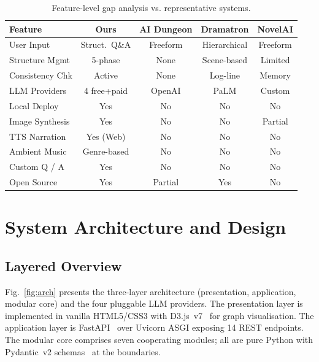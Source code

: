 \documentclass[conference,10pt,a4paper]{IEEEtran}
\begin{document}
\begin{table}[!t]
\caption{Feature-level gap analysis vs. representative systems.}
\label{tab:gap}
\centering
\renewcommand{\arraystretch}{1.15}
\begin{tabular}{@{}l|cccc@{}}
\toprule
\textbf{Feature} & \textbf{Ours} & \textbf{AI Dungeon} & \textbf{Dramatron} & \textbf{NovelAI} \\
\midrule
User Input         & Struct.\ Q\&A & Freeform   & Hierarchical & Freeform \\
Structure Mgmt     & 5-phase       & None       & Scene-based  & Limited \\
Consistency Chk    & Active        & None       & Log-line     & Memory \\
LLM Providers      & 4 free+paid   & OpenAI     & PaLM         & Custom \\
Local Deploy       & Yes           & No         & No           & No \\
Image Synthesis    & Yes           & No         & No           & Partial \\
TTS Narration      & Yes (Web)     & No         & No           & No \\
Ambient Music      & Genre-based   & No         & No           & No \\
Custom Q / A       & Yes           & No         & No           & No \\
Open Source        & Yes           & Partial    & Yes          & No \\
\bottomrule
\end{tabular}
\end{table}

\section{System Architecture and Design}\label{sec:arch}

\subsection{Layered Overview}
Fig.~\ref{fig:arch} presents the three-layer architecture
(presentation, application, modular core) and the four pluggable LLM
providers. The presentation layer is implemented in vanilla
HTML5/CSS3 with D3.js~v7~\cite{bostock2011d3} for graph visualisation.
The application layer is FastAPI~\cite{ramirez2024fastapi} over
Uvicorn ASGI exposing 14 REST endpoints. The modular core comprises
seven cooperating modules; all are pure Python with Pydantic~v2
schemas~\cite{colvin2024pydantic} at the boundaries.
\end{document}
